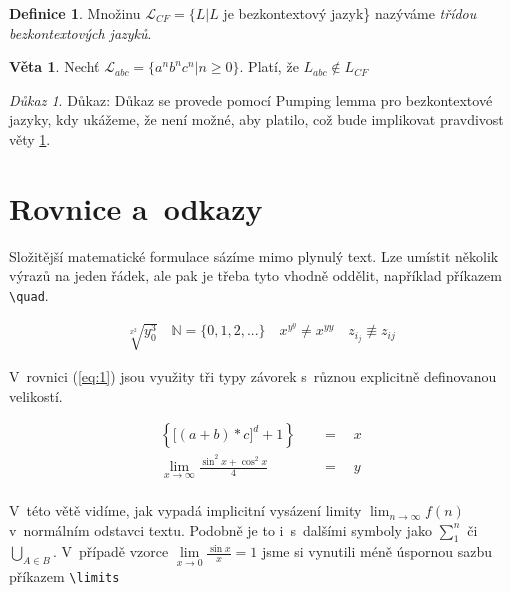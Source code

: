 \documentclass[a4paper, 11pt, times]{article}
\theoremstyle{definition}
\newtheorem{definition}{Definice}[section]
\theoremstyle{theorem}
\newtheorem{lema}{Věta}
\theoremstyle{remark}
\newtheorem*{remark}{Důkaz}
\begin{document}
\begin{twocolumn}
  \begin{definition}
  Množinu $\mathcal{L}_{CF}=\{L|L$ je bezkontextový jazyk\} nazýváme \textit{třídou bezkontextových jazyků}.
  \end{definition}


  \begin{lema}  
  \label{fig:veta}
  Nechť $\mathcal{L}_{abc}=\{a^n b^n c^n|n \geq 0\}.$ Platí, že $L_{abc} \notin  L_{CF}$
  \end{lema}


  \begin{remark}
   Důkaz: Důkaz se provede pomocí Pumping lemma pro bezkontextové jazyky, kdy ukážeme,
   že není možné, aby platilo, což bude implikovat
  pravdivost věty \ref{fig:veta}.\hfill \qedsymbol
   \end{remark}

  
  \section{Rovnice a~odkazy}
  Složitější matematické formulace sázíme mimo plynulý text. Lze umístit několik
  výrazů na jeden řádek, ale pak je třeba tyto vhodně oddělit, například příkazem \verb|\quad|.

  \begin{align*}
  {\sqrt[x^2]{y^3_0} \quad \mathbb{N}=\{0,1,2,...\} \quad x^{y^y} \neq x^{yy} \quad z_{i_j} \not \equiv z_{ij}}
  \end{align*}

  V~rovnici (\ref{eq:1}) jsou využity tři typy závorek s~různou explicitně definovanou velikostí.

  \begin{equation} \label{eq:1} %
    \begin{aligned}
    \left\{\Big[(a+b)*c\Big]^d+1\right\}\quad&=\quad x \\
    \lim_{x \to \infty} \frac{\sin^2x+\cos^2x}{4} \quad &= \quad y
    \end{aligned}
  \end{equation}\\

  V~této větě vidíme, jak vypadá implicitní vysázení limity $\lim_{n \to \infty} f(n)$ v~normálním
   odstavci textu. Podobně je to i~s~dalšími symboly jako $\sum_{1}^{n}$ či $\bigcup_{A \in B}$. V~případě
    vzorce $\lim\limits_{x \to 0} \frac{\sin x}{x} = 1$ jsme si vynutili méně úspornou sazbu příkazem
  \verb|\limits|


\end{twocolumn}
\end{document}

